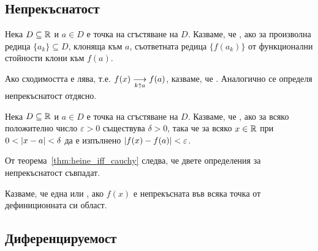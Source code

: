 \documentclass[numbers=endperiod, bibliography=totocnumbered]{scrartcl}
\begin{document}
\subsection{Непрекъснатост}

\begin{definition}
  Нека \( D \subseteq \R \) и \( a \in D \) е точка на сгъстяване на \( D \). Казваме, че , ако за произволна редица \( \{ a_k \} \subseteq D \), клоняща към \( a \), съответната редица \( \{ f(a_k) \} \) от функционални стойности клони към \( f(a) \).

  Ако сходимостта е лява, т.е. \( f(x) \Conv[k \uparrow a]{} f(a) \), казваме, че . Аналогично се определя непрекъснатост отдясно.
\end{definition}

\begin{definition}
  Нека \( D \subseteq \R \) и \( a \in D \) е точка на сгъстяване на \( D \). Казваме, че , ако за всяко положително число \( \varepsilon > 0 \) съществува \( \delta > 0 \), така че за всяко \( x \in \R \) при \( 0 < \Abs{x - a} < \delta \) да е изпълнено \( \Abs{f(x) - f(a)} < \varepsilon \).
\end{definition}

\begin{note}
  От теорема~\ref{thm:heine_iff_cauchy} следва, че двете определения за непрекъснатост съвпадат.
\end{note}

\begin{definition}
  Казваме, че една  или , ако \( f(x) \) е непрекъсната във всяка точка от дефиниционната си област.
\end{definition}

\subsection{Диференцируемост}
\end{document}
